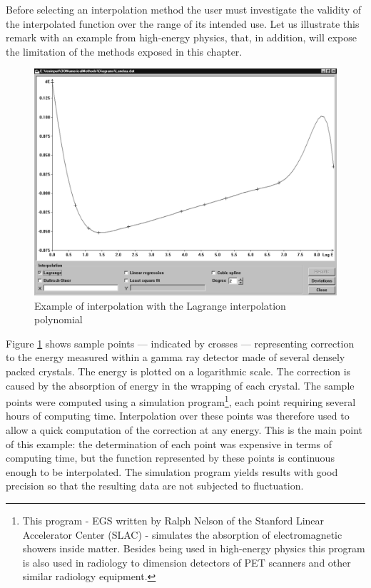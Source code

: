  Before selecting an interpolation method the
user must investigate the validity of the interpolated function
over the range of its intended use. Let us illustrate this remark
with an example from high-energy physics, that, in addition, will
expose the limitation of the methods exposed in this chapter.

\begin{figure}
\label{fig:landauinterpol}
\centering\includegraphics[width=12cm]{Figures/Lagrange}
\caption{Example of interpolation with the Lagrange interpolation
polynomial}
\end{figure}
Figure \ref{fig:landauinterpol} shows sample points --- indicated
by crosses --- representing correction to the energy measured
within a gamma ray detector made of several densely packed
crystals. The energy is plotted on a logarithmic scale. The
correction is caused by the absorption of energy in the wrapping
of each crystal. The sample points were computed using a
simulation program\footnote{This program - EGS written by Ralph
Nelson of the Stanford Linear Accelerator Center (SLAC) -
simulates the absorption of electromagnetic showers inside matter.
Besides being used in high-energy physics this program is also
used in radiology to dimension detectors of PET scanners and other
similar radiology equipment.}, each point requiring several hours
of computing time. Interpolation over these points was therefore
used to allow a quick computation of the correction at any energy.
This is the main point of this example: the determination of each
point was expensive in terms of computing time, but the function
represented by these points is continuous enough to be
interpolated. The simulation program yields results with good
precision so that the resulting data are not subjected to
fluctuation.

